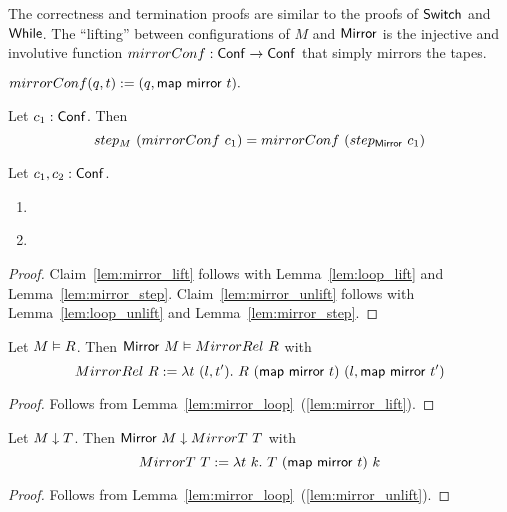 The correctness and termination proofs are similar to the proofs of $\mathsf{Switch}$ and $\mathsf{While}$.  The ``lifting'' between configurations of $M$ and
$\mathsf{Mirror}$ is the injective and involutive function $mirrorConf : \mathsf{Conf} \rightarrow \mathsf{Conf}$ that simply mirrors the tapes.

\begin{definition}
  \label{def:mirrorConf}
  $mirrorConf(q,t) := (q, \mathsf{map}~\mathsf{mirror}~t).$
\end{definition}


\begin{lemma}
  \label{lem:mirror_step}
  Let $c_1 : \mathsf{Conf}$.  Then
  \[ step_M~(mirrorConf~c_1) = mirrorConf~(step_{\mathsf{Mirror}}~c_1) \]
\end{lemma}

\begin{lemma}
  \label{lem:mirror_loop}
  Let $c_1, c_2 : \mathsf{Conf}$.
  \begin{enumerate}
  \item \label{lem:mirror_lift}
  \item \label{lem:mirror_unlift}
  \end{enumerate}
\end{lemma}
\begin{proof}
  Claim~\ref{lem:mirror_lift} follows with Lemma~\ref{lem:loop_lift} and Lemma~\ref{lem:mirror_step}.  Claim~\ref{lem:mirror_unlift} follows with
  Lemma~\ref{lem:loop_unlift} and Lemma~\ref{lem:mirror_step}.
\end{proof}

\begin{lemma}
  Let $M \mathrel{\vDash} R$.  Then $\mathsf{Mirror}~M \mathrel{\vDash} MirrorRel~R$ with
  \[
    MirrorRel~R := \lambda t~(l, t').~ R~(\mathsf{map}~\mathsf{mirror}~t)~(l, \mathsf{map}~\mathsf{mirror}~t')
  \]
\end{lemma}
\begin{proof}
  Follows from Lemma~\ref{lem:mirror_loop}~(\ref{lem:mirror_lift}).
\end{proof}
\begin{lemma}
  Let $M \mathrel{\downarrow} T$.  Then $\mathsf{Mirror}~M \mathrel{\downarrow} MirrorT~T$ with
  \[
    MirrorT~T := \lambda t~k.~ T~(\mathsf{map}~\mathsf{mirror}~t)~k
  \]
\end{lemma}
\begin{proof}
  Follows from Lemma~\ref{lem:mirror_loop}~(\ref{lem:mirror_unlift}).
\end{proof}

